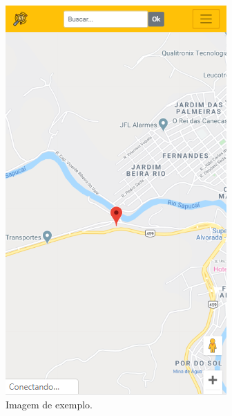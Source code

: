 \begin{figure}[!htb]
\centering
\caption{Imagem de exemplo.}
\includegraphics[width=\linewidth]{figuras/tela_mapa.png}
\end{figure}

